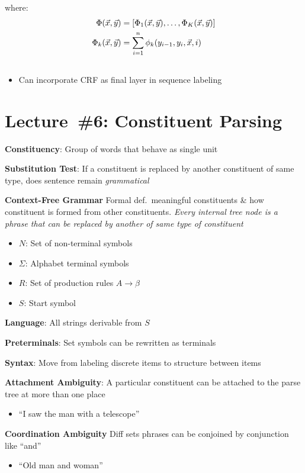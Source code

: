 \documentclass[9pt]{extarticle}
\renewcommand{\green}[1]{{\color{ForestGreen} #1}}
\newcommand{\greenbf}[1]{\textbf{\green{#1}}}
\begin{document}
\begin{multicols}{3}
  where:
  \begin{align*}
      \Phi(\vec{x},\vec{y}) &= \lbrack\Phi_{1}(\vec{x},\vec{y}),\ldots,\Phi_{K}(\vec{x},\vec{y})\rbrack \\
      \Phi_{k}(\vec{x},\vec{y}) &= \sum_{i=1}^{n} \phi_{k}(y_{i-1},y_{i},\vec{x},i)
  \end{align*}
  \subsection*{}

  \begin{itemize}
    \item Can incorporate CRF as final layer in sequence labeling
  \end{itemize}

  \section*{Lecture~\#6: Constituent Parsing}

  \greenbf{Constituency}: Group of words that behave as single unit

  \greenbf{Substitution Test}: If a constituent is replaced by another constituent of same type, does sentence remain \textit{grammatical}

  \greenbf{Context-Free Grammar} Formal def.\ meaningful constituents \& how constituent is formed from other constituents.  \textit{Every internal tree node is a phrase that can be replaced by another of same type of constituent}
  \begin{itemize}
    \item $N$: Set of non-terminal symbols
    \item $\Sigma$: Alphabet terminal symbols
    \item $R$: Set of production rules $A \rightarrow \beta$
    \item $S$: Start symbol
  \end{itemize}

  \textbf{Language}: All strings derivable from $S$

  \textbf{Preterminals}: Set symbols can be rewritten as terminals

  \textbf{Syntax}: Move from labeling discrete items to structure between items

  \greenbf{Attachment Ambiguity}: A particular constituent can be attached to the parse tree at more than one place
  \begin{itemize}
    \item ``I saw the man with a telescope''
  \end{itemize}
  \greenbf{Coordination Ambiguity} Diff sets phrases can be conjoined by conjunction like ``and''
  \begin{itemize}
    \item ``Old man and woman''
  \end{itemize}


\end{multicols}
\end{document}
